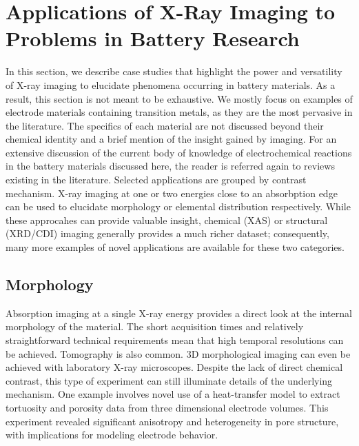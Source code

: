 \documentclass[journal=cmatex,manuscript=perspective]{achemso}
\begin{document}
\section{Applications of X-Ray Imaging to Problems in Battery Research}

In this section, we describe case studies that highlight the power and
versatility of X-ray imaging to elucidate phenomena occurring in
battery materials. As a result, this section is not meant to be
exhaustive. We mostly focus on examples of electrode materials
containing transition metals, as they are the most pervasive in the
literature. The specifics of each material are not discussed beyond
their chemical identity and a brief mention of the insight gained by
imaging. For an extensive discussion of the current body of knowledge
of electrochemical reactions in the battery materials discussed here,
the reader is referred again to reviews existing in the
literature\cite{whittingham2014, balogun2016}. Selected applications
are grouped by contrast mechanism. X-ray imaging at one or two
energies close to an absorbption edge can be used to elucidate
morphology or elemental distribution respectively. While these
approcahes can provide valuable insight, chemical (XAS) or structural
(XRD/CDI) imaging generally provides a much richer dataset;
consequently, many more examples of novel applications are available
for these two categories.

\subsection{Morphology}

Absorption imaging at a single X-ray energy provides a direct look at
the internal morphology of the material. The short acquisition times
and relatively straightforward technical requirements mean that high
temporal resolutions can be achieved. Tomography is also common. 3D
morphological imaging can even be achieved with laboratory X-ray
microscopes\cite{shearing2014-2}. Despite the lack of direct chemical
contrast, this type of experiment can still illuminate details of the
underlying mechanism. One example involves novel use of a
heat-transfer model to extract tortuosity and porosity data from three
dimensional electrode volumes. This experiment revealed significant
anisotropy and heterogeneity in pore structure, with implications for
modeling electrode behavior\cite{shearing2014}.
\end{document}
